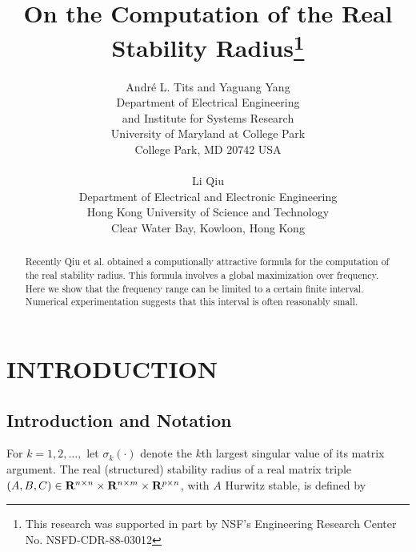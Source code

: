 \textheight 9.0in
\textwidth 6.30in
\voffset -0.85in
\hoffset -0.60in
\def\R{{\bf R}}
\def\j{{\rm j}}
\def\C{{\bf C}}

\title{On the Computation of the Real Stability Radius\footnote{
       This research was supported in part by NSF's Engineering
       Research Center No. NSFD-CDR-88-03012}}
\author{Andr\'e L. Tits and Yaguang Yang\\
       Department of Electrical Engineering\\
       and Institute for Systems Research\\
       University of Maryland at College Park\\
       College Park, MD 20742 USA\\
          \\
       Li Qiu\\
       Department of Electrical and Electronic Engineering\\
       Hong Kong University of Science and Technology\\
       Clear Water Bay, Kowloon, Hong Kong}

\maketitle

\begin{abstract}
Recently Qiu et al. obtained a computionally attractive 
formula for the computation of the real stability radius. This formula 
involves a global maximization over frequency. Here we show that the frequency 
range can be limited to a certain finite interval. Numerical experimentation 
suggests that this interval is often reasonably small.
\end{abstract}

\tableofcontents

\chapter{ INTRODUCTION}


\section{Introduction and Notation}

\indent
For $k=1,2,\ldots,$ let $\sigma_k(\cdot)$ denote the $k$th largest singular 
value of its matrix argument. The real (structured) stability radius of a 
real matrix triple $(A,B,C) \in \R^{n \times n} \times \R^{n \times m} 
\times \R^{p \times n}$, with $A$ Hurwitz stable, is defined by 
~\cite {aho83,ansi89}
 
